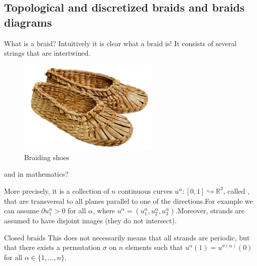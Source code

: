 \documentclass[9pt, english]{beamer}
\theoremstyle{definition}
\newcommand{\R}{\mathbb{R}}                     %
\begin{document}
\subsection{Topological and discretized braids and braids diagrams}
\begin{frame}{What is a braid?}
        Intuitively it is clear what a braid is! It consists of several strings that are
        intertwined.
        \begin{figure}\label{fig:shoes}
        \includegraphics[width=0.6\textwidth]{images/2774braiding_shoe.jpg}\caption{Braiding shoes}
        \end{figure}
\end{frame}
\begin{frame}{and in mathematics?}
    \begin{block}{More precisely,}
        it is a collection of $n$ continuous curves
        $u^\alpha:[0,1] \hookrightarrow \R^3$, called
        , \pause
        that are transversal to all planes parallel to one of the
        directions.\pause  For example we can assume $\partial u_1^\alpha>0$
        for all $\alpha$, where $u^\alpha=(u_1^\alpha, u_2^\alpha,
        u_3^\alpha)$.\pause Moreover, strands are assumed to have disjoint
        images \alert{(they do not intersect)}.
    \end{block}\pause
    \begin{block}{Closed braids}
        This does not necessarily means that all strands are
        periodic,\pause
        but that there exists a permutation $\sigma$ on $n$ elements such
        that $u^\alpha(1)=u^{\sigma(\alpha)}(0)$ for all $\alpha \in
        \{1, \dots,n\}$.
    \end{block}
\end{frame}
\end{document}
